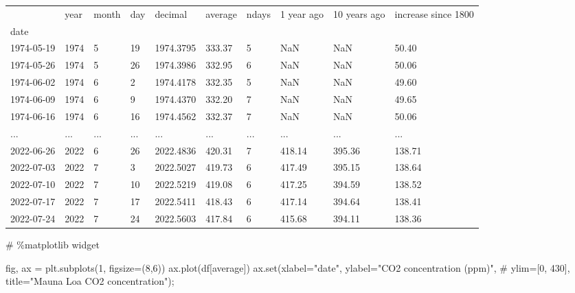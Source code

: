\documentclass[
  letterpaper,
  DIV=11,
  numbers=noendperiod,
  oneside]{scrreprt}
\newenvironment{Shaded}{\begin{snugshade}}{\end{snugshade}}
\newcommand{\BuiltInTok}[1]{\textcolor[rgb]{0.00,0.23,0.31}{#1}}
\newcommand{\CommentTok}[1]{\textcolor[rgb]{0.37,0.37,0.37}{#1}}
\newcommand{\DecValTok}[1]{\textcolor[rgb]{0.68,0.00,0.00}{#1}}
\newcommand{\NormalTok}[1]{\textcolor[rgb]{0.00,0.23,0.31}{#1}}
\newcommand{\OperatorTok}[1]{\textcolor[rgb]{0.37,0.37,0.37}{#1}}
\newcommand{\StringTok}[1]{\textcolor[rgb]{0.13,0.47,0.30}{#1}}
\begin{document}
\begin{longtable}[]{@{}llllllllll@{}}
\toprule()
& year & month & day & decimal & average & ndays & 1 year ago & 10 years
ago & increase since 1800 \\
date & & & & & & & & & \\
\midrule()
\endhead
1974-05-19 & 1974 & 5 & 19 & 1974.3795 & 333.37 & 5 & NaN & NaN &
50.40 \\
1974-05-26 & 1974 & 5 & 26 & 1974.3986 & 332.95 & 6 & NaN & NaN &
50.06 \\
1974-06-02 & 1974 & 6 & 2 & 1974.4178 & 332.35 & 5 & NaN & NaN &
49.60 \\
1974-06-09 & 1974 & 6 & 9 & 1974.4370 & 332.20 & 7 & NaN & NaN &
49.65 \\
1974-06-16 & 1974 & 6 & 16 & 1974.4562 & 332.37 & 7 & NaN & NaN &
50.06 \\
... & ... & ... & ... & ... & ... & ... & ... & ... & ... \\
2022-06-26 & 2022 & 6 & 26 & 2022.4836 & 420.31 & 7 & 418.14 & 395.36 &
138.71 \\
2022-07-03 & 2022 & 7 & 3 & 2022.5027 & 419.73 & 6 & 417.49 & 395.15 &
138.64 \\
2022-07-10 & 2022 & 7 & 10 & 2022.5219 & 419.08 & 6 & 417.25 & 394.59 &
138.52 \\
2022-07-17 & 2022 & 7 & 17 & 2022.5411 & 418.43 & 6 & 417.14 & 394.64 &
138.41 \\
2022-07-24 & 2022 & 7 & 24 & 2022.5603 & 417.84 & 6 & 415.68 & 394.11 &
138.36 \\
\bottomrule()
\end{longtable}

\begin{Shaded}
\begin{Highlighting}[]
\CommentTok{\# \%matplotlib widget}

\NormalTok{fig, ax }\OperatorTok{=}\NormalTok{ plt.subplots(}\DecValTok{1}\NormalTok{, figsize}\OperatorTok{=}\NormalTok{(}\DecValTok{8}\NormalTok{,}\DecValTok{6}\NormalTok{))}
\NormalTok{ax.plot(df[}\StringTok{\textquotesingle{}average\textquotesingle{}}\NormalTok{])}
\NormalTok{ax.}\BuiltInTok{set}\NormalTok{(xlabel}\OperatorTok{=}\StringTok{"date"}\NormalTok{,}
\NormalTok{       ylabel}\OperatorTok{=}\StringTok{"CO2 concentration (ppm)"}\NormalTok{,}
       \CommentTok{\# ylim=[0, 430],}
\NormalTok{       title}\OperatorTok{=}\StringTok{"Mauna Loa CO2 concentration"}\NormalTok{)}\OperatorTok{;}
\end{Highlighting}
\end{Shaded}
\end{document}
